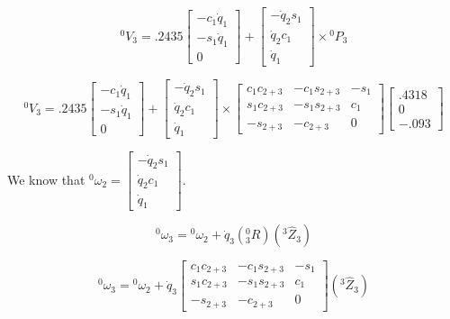 $$
{}^{0}V_{3} = .2435\begin{bmatrix} -c_1\dot{q}_1 \\ -s_1\dot{q}_1 \\ 0\end{bmatrix} + \left[\begin{array}{c} -\dot{q}_{2}s_{1} \\ \dot{q}_{2}c_{1} \\ \dot{q}_{1}
\end{array}\right] \times {}^{0}P_{3}
$$




$$
{}^{0}V_{3} = .2435 \begin{bmatrix} -c_1\dot{q}_1 \\ -s_1\dot{q}_1 \\ 0\end{bmatrix} + \left[\begin{array}{c} -\dot{q}_{2}s_{1} \\ \dot{q}_{2}c_{1} \\ \dot{q}_{1}
\end{array}\right] \times \left[\begin{array}{ccc}
c_{1} c_{2+3} & -c_{1} s_{2+3} & -s_{1} \\
s_{1} c_{2+3} & -s_{1} s_{2+3} & c_{1} \\
-s_{2+3} & -c_{2+3} & 0
\end{array}\right] \begin{bmatrix} .4318 \\ 0 \\ -.093 \end{bmatrix}
$$


\noindent We know that ${}^{0}\omega_2 = \left[\begin{array}{c} -\dot{q}_{2}s_{1} \\ \dot{q}_{2}c_{1} \\ \dot{q}_{1}
\end{array}\right]$.


$$
{}^{0}\omega_3 = {}^{0}\omega_{2} + \dot{q}_{3} \left( {}^{0}_{3}R \right) \left( {}^{3}\hat{Z}_{3}\right)
$$


$$
{}^{0}\omega_3 = {}^{0}\omega_{2} + \dot{q}_{3} \left[\begin{array}{ccc}
c_{1} c_{2+3} & -c_{1} s_{2+3} & -s_{1} \\
s_{1} c_{2+3} & -s_{1} s_{2+3} & c_{1} \\
-s_{2+3} & -c_{2+3} & 0
\end{array}\right] \left( {}^{3}\hat{Z}_{3}\right)
$$


